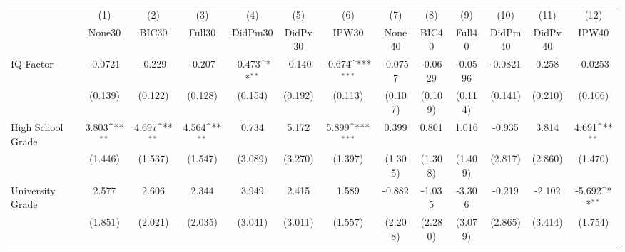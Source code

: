 {
\def\sym#1{\ifmmode^{#1}\else\(^{#1}\)\fi}
\begin{tabular}{l*{12}{c}}
\toprule
            &\multicolumn{1}{c}{(1)}&\multicolumn{1}{c}{(2)}&\multicolumn{1}{c}{(3)}&\multicolumn{1}{c}{(4)}&\multicolumn{1}{c}{(5)}&\multicolumn{1}{c}{(6)}&\multicolumn{1}{c}{(7)}&\multicolumn{1}{c}{(8)}&\multicolumn{1}{c}{(9)}&\multicolumn{1}{c}{(10)}&\multicolumn{1}{c}{(11)}&\multicolumn{1}{c}{(12)}\\
            &\multicolumn{1}{c}{None30}&\multicolumn{1}{c}{BIC30}&\multicolumn{1}{c}{Full30}&\multicolumn{1}{c}{DidPm30}&\multicolumn{1}{c}{DidPv30}&\multicolumn{1}{c}{IPW30}&\multicolumn{1}{c}{None40}&\multicolumn{1}{c}{BIC40}&\multicolumn{1}{c}{Full40}&\multicolumn{1}{c}{DidPm40}&\multicolumn{1}{c}{DidPv40}&\multicolumn{1}{c}{IPW40}\\
\midrule
IQ Factor   &     -0.0721         &      -0.229         &      -0.207         &      -0.473\sym{**} &      -0.140         &      -0.674\sym{***}&     -0.0757         &     -0.0629         &     -0.0596         &     -0.0821         &       0.258         &     -0.0253         \\
            &     (0.139)         &     (0.122)         &     (0.128)         &     (0.154)         &     (0.192)         &     (0.113)         &     (0.107)         &     (0.109)         &     (0.114)         &     (0.141)         &     (0.210)         &     (0.106)         \\
\addlinespace
High School Grade&       3.803\sym{**} &       4.697\sym{**} &       4.564\sym{**} &       0.734         &       5.172         &       5.899\sym{***}&       0.399         &       0.801         &       1.016         &      -0.935         &       3.814         &       4.691\sym{**} \\
            &     (1.446)         &     (1.537)         &     (1.547)         &     (3.089)         &     (3.270)         &     (1.397)         &     (1.305)         &     (1.308)         &     (1.409)         &     (2.817)         &     (2.860)         &     (1.470)         \\
\addlinespace
University Grade&       2.577         &       2.606         &       2.344         &       3.949         &       2.415         &       1.589         &      -0.882         &      -1.035         &      -3.306         &      -0.219         &      -2.102         &      -5.692\sym{**} \\
            &     (1.851)         &     (2.021)         &     (2.035)         &     (3.041)         &     (3.011)         &     (1.557)         &     (2.208)         &     (2.280)         &     (3.079)         &     (2.865)         &     (3.414)         &     (1.754)         \\

\end{tabular}}
